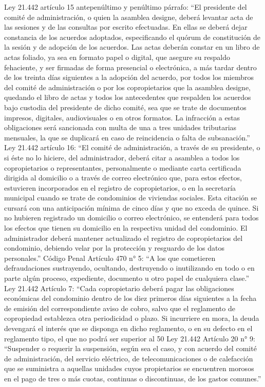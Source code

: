 Ley 21.442 artículo 15 antepenúltimo y penúltimo párrafo: “El presidente del comité de administración, o quien la asamblea designe, deberá levantar acta de las sesiones y de las consultas por escrito efectuadas. En ellas se deberá dejar constancia de los acuerdos adoptados, especificando el quórum de constitución de la sesión y de adopción de los acuerdos.
Las actas deberán constar en un libro de actas foliado, ya sea en formato papel o digital, que asegure su respaldo fehaciente, y ser firmadas de forma presencial o electrónica, a más tardar dentro de los treinta días siguientes a la adopción del acuerdo, por todos los miembros del comité de administración o por los copropietarios que la asamblea designe, quedando el libro de actas y todos los antecedentes que respalden los acuerdos bajo custodia del presidente de dicho comité, sea que se trate de documentos impresos, digitales, audiovisuales o en otros formatos. La infracción a estas obligaciones será sancionada con multa de una a tres unidades tributarias mensuales, la que se duplicará en caso de reincidencia o falta de subsanación.”
Ley 21.442 artículo 16: “El comité de administración, a través de su presidente, o si éste no lo hiciere, del administrador, deberá citar a asamblea a todos los copropietarios o representantes, personalmente o mediante carta certificada dirigida al domicilio o a través de correo electrónico que, para estos efectos, estuvieren incorporados en el registro de copropietarios, o en la secretaría municipal cuando se trate de condominios de viviendas sociales. Esta citación se cursará con una anticipación mínima de cinco días y que no exceda de quince. Si no hubieren registrado un domicilio o correo electrónico, se entenderá para todos los efectos que tienen su domicilio en la respectiva unidad del condominio. El administrador deberá mantener actualizado el registro de copropietarios del condominio, debiendo velar por la protección y resguardo de los datos personales.”
Código Penal Artículo 470 n° 5: “A los que cometieren defraudaciones sustrayendo, ocultando, destruyendo o inutilizando en todo o en parte algún proceso, expediente, documento u otro papel de cualquiera clase.”
Ley 21.442 Artículo 7: “Cada copropietario deberá pagar las obligaciones económicas del condominio dentro de los diez primeros días siguientes a la fecha de emisión del correspondiente aviso de cobro, salvo que el reglamento de copropiedad establezca otra periodicidad o plazo. Si incurriere en mora, la deuda devengará el interés que se disponga en dicho reglamento, o en su defecto en el reglamento tipo, el que no podrá ser superior al 50%
Ley 21.442 Artículo 20 n° 9: “Suspender o requerir la suspensión, según sea el caso, y con acuerdo del comité de administración, del servicio eléctrico, de telecomunicaciones o de calefacción que se suministra a aquellas unidades cuyos propietarios se encuentren morosos en el pago de tres o más cuotas, continuas o discontinuas, de los gastos comunes.”
